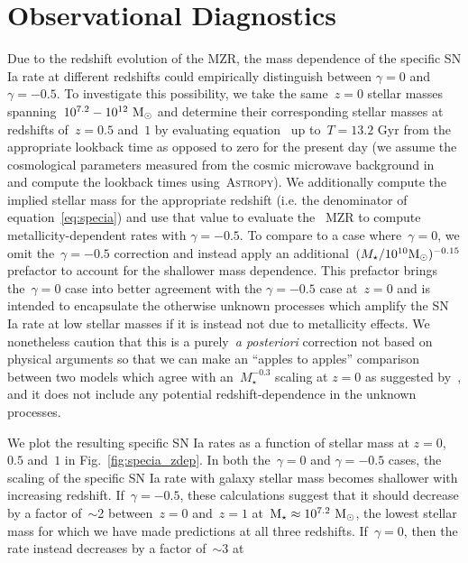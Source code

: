\documentclass[ms.tex]{subfiles}
\begin{document}
\section{Observational Diagnostics}
\label{sec:diagnostics}

Due to the redshift evolution of the MZR, the mass dependence of the specific
SN Ia rate at different redshifts could empirically distinguish between
$\gamma = 0$ and~$\gamma = -0.5$.
To investigate this possibility, we take the same~$z = 0$ stellar masses
spanning~$10^{7.2} - 10^{12}~\text{M}_\odot$ and determine their corresponding stellar
masses at redshifts of~$z = 0.5$ and~$1$ by evaluating equation~
up to~$T = 13.2$ Gyr from the appropriate lookback time as opposed to zero for
the present day (we assume the cosmological parameters measured from the cosmic
microwave background in~\citealt{Planck2014} and compute the lookback times
using~\textsc{Astropy}).
We additionally compute the implied stellar mass for the appropriate redshift
(i.e. the denominator of equation~\ref{eq:specia}) and use that value to
evaluate the~\citet{Zahid2014} MZR to compute metallicity-dependent rates with
$\gamma = -0.5$.
To compare to a case where~$\gamma = 0$, we omit the~$\gamma = -0.5$ correction
and instead apply an additional~$(M_\star / 10^{10} \text{M}_\odot)^{-0.15}$
prefactor to account for the shallower mass dependence.
This prefactor brings the~$\gamma = 0$ case into better agreement with the
$\gamma = -0.5$ case at~$z = 0$ and is intended to encapsulate the otherwise
unknown processes which amplify the SN Ia rate at low stellar masses if it is
instead not due to metallicity effects.
We nonetheless caution that this is a purely~\textit{a posteriori} correction
not based on physical arguments so that we can make an ``apples to apples''
comparison between two models which agree with an~$M_\star^{-0.3}$ scaling at
$z = 0$ as suggested by~\citet{Gandhi2022}, and it does not include any
potential redshift-dependence in the unknown processes.
\par
We plot the resulting specific SN Ia rates as a function of stellar mass at
$z = 0$,~$0.5$ and~$1$ in Fig.~\ref{fig:specia_zdep}.
In both the~$\gamma = 0$ and $\gamma = -0.5$ cases, the scaling of the specific
SN Ia rate with galaxy stellar mass becomes shallower with increasing redshift.
If~$\gamma = -0.5$, these calculations suggest that it should decrease by a
factor of~$\sim$2 between~$z = 0$ and~$z = 1$ at~$\text{M}_\star \approx
10^{7.2}~\text{M}_\odot$, the lowest stellar mass for which we have made predictions at
all three redshifts.
If~$\gamma = 0$, then the rate instead decreases by a factor of~$\sim$3 at
\end{document}

